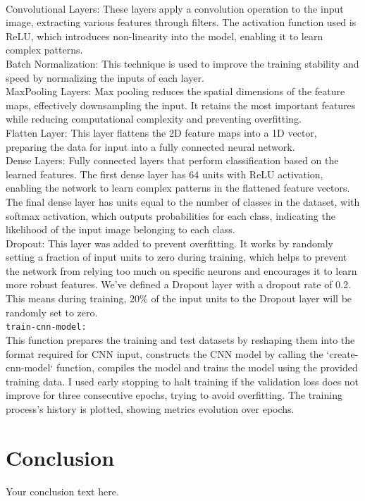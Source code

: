 \documentclass{article}
\newcommand{\code}[1]{\colorbox{light-gray}{\texttt{#1}}}
\begin{document}
\text{ }\\
Convolutional Layers: These layers apply a convolution operation to the input image,
extracting various features through filters.
The activation function used is ReLU,
which introduces non-linearity into the model, enabling it to learn complex patterns.\\\newline
Batch Normalization: This technique is used to improve the training stability and speed
by normalizing the inputs of each layer.\\\newline
MaxPooling Layers: Max pooling reduces the spatial dimensions of the feature maps,
effectively downsampling the input.
It retains the most important features while reducing computational
complexity and preventing overfitting.\\\newline
Flatten Layer: This layer flattens the 2D feature maps into a 1D vector,
preparing the data for input into a fully connected neural network.\\\newline
Dense Layers: Fully connected layers that perform classification based on the learned features.
The first dense layer has 64 units with ReLU activation, enabling the network to learn complex
patterns in the flattened feature vectors.
The final dense layer has units equal to the number of classes
in the dataset, with softmax activation, which outputs probabilities for each class,
indicating the likelihood of the input image belonging to each class.\\\newline
Dropout: This layer was added to prevent overfitting.
It works by randomly setting a fraction of input units to zero during training,
which helps to prevent the network from relying too much on specific neurons
and encourages it to learn more robust features.
We've defined a Dropout layer with a dropout rate of 0.2.
This means during training, ${20\%}$ of the input units to the Dropout layer will be randomly set to zero.\\\newline
\code{train-cnn-model:}\\\newline
This function prepares the training and test datasets by reshaping them into the format
required for CNN input, constructs the CNN model by calling the `create-cnn-model` function,
compiles the model and trains the model using the provided training data.
I used early stopping to halt training if the validation loss does not improve for three consecutive epochs,
trying to avoid overfitting.
The training process's history is plotted, showing metrics evolution over epochs.\\



\newpage
\section{Conclusion}
Your conclusion text here.
\end{document}

